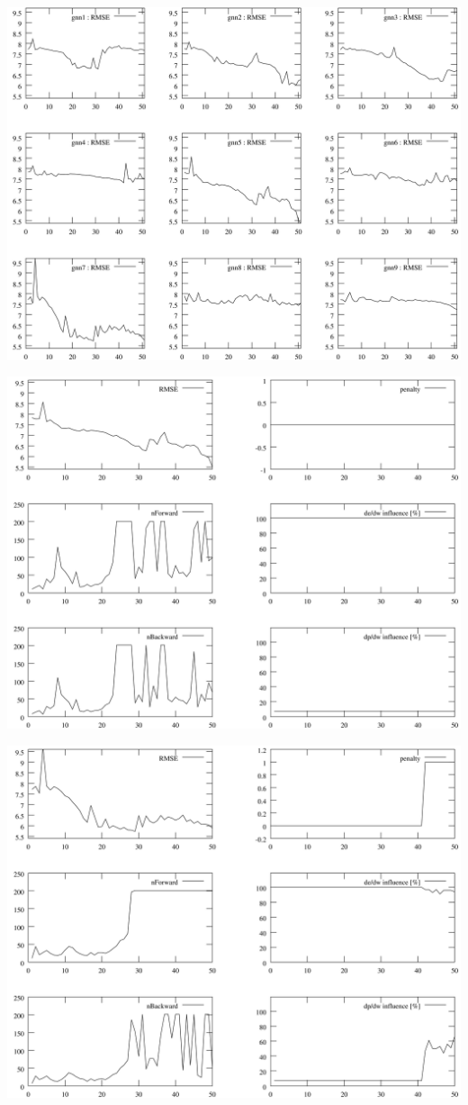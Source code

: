 \documentclass{beamer}
\begin{document}
\begin{frame}
	\includegraphics[scale=0.065]{img/rmse_gnn1-9}
\end{frame}
\begin{frame}
	\includegraphics[scale=0.065]{img/gnn5}
\end{frame}
\begin{frame}
	\includegraphics[scale=0.065]{img/gnn7}
\end{frame}
\end{document}
